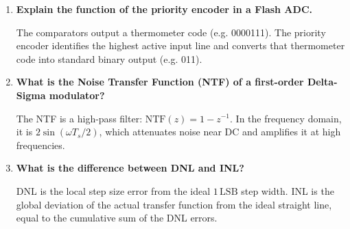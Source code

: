 \documentclass[12pt,a4paper]{article}
\newcommand{\Q}[1]{\textbf{#1}\par\noindent\ignorespaces}
\begin{document}
\begin{tcolorbox}[exambox, title={\textbf{Frequently Asked / Viva Questions}}]
\begin{enumerate}[topsep=0pt, label=\textbf{Q\arabic*.}, itemsep=5pt]
  \item \Q{Explain the function of the priority encoder in a Flash ADC.}
    The comparators output a thermometer code (e.g. 0000111). The priority encoder identifies the highest active input line and converts that thermometer code into standard binary output (e.g. 011).
  \item \Q{What is the Noise Transfer Function (NTF) of a first-order Delta-Sigma modulator?}
    The NTF is a high-pass filter: $\text{NTF}(z) = 1 - z^{-1}$. In the frequency domain, it is $2 \sin(\omega T_s /2)$, which attenuates noise near DC and amplifies it at high frequencies.
  \item \Q{What is the difference between DNL and INL?}
    DNL is the local step size error from the ideal $1\,\text{LSB}$ step width. INL is the global deviation of the actual transfer function from the ideal straight line, equal to the cumulative sum of the DNL errors.
\end{enumerate}
\end{tcolorbox}
\end{document}
